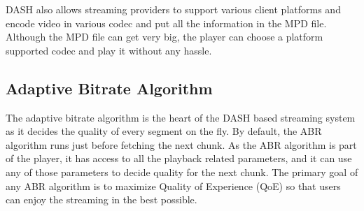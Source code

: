 DASH also allows streaming providers to support various client platforms and encode video in various codec and put all the information in the MPD file. Although the MPD file can get very big, the player can choose a platform supported codec and play it without any hassle.


\subsection{Adaptive Bitrate Algorithm}
The adaptive bitrate algorithm is the heart of the DASH based streaming system as it decides the quality of every segment on the fly. By default, the ABR algorithm runs just before fetching the next chunk. As the ABR algorithm is part of the player, it has access to all the playback related parameters, and it can use any of those parameters to decide quality for the next chunk. The primary goal of any ABR algorithm is to maximize Quality of Experience (QoE) so that users can enjoy the streaming in the best possible.

